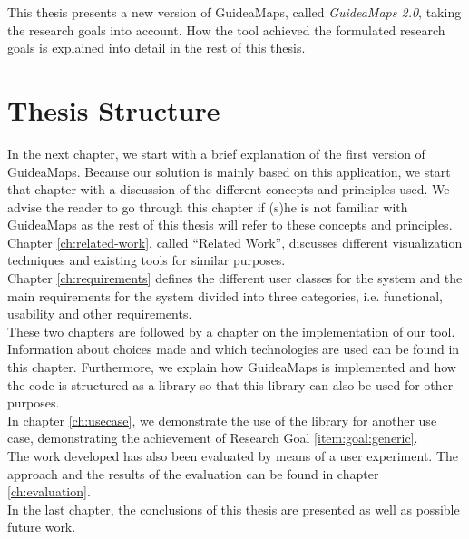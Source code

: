 This thesis presents a new version of GuideaMaps, called \textit{GuideaMaps 2.0}, taking the research goals into account. How the tool achieved the formulated research goals is explained into detail in the rest of this thesis.\\




\section{Thesis Structure}\label{sec:thesis-structure}
In the next chapter, we start with a brief explanation of the first version of GuideaMaps. Because our solution is mainly based on this application, we start that chapter with a discussion of the different concepts and principles used. We advise the reader to go through this chapter if (s)he is not familiar with GuideaMaps as the rest of this thesis will refer to these concepts and principles.\\

Chapter \ref{ch:related-work}, called ``Related Work'', discusses different visualization techniques and existing tools for similar purposes.\\

Chapter \ref{ch:requirements} defines the different user classes for the system and the main requirements for the system divided into three categories, i.e. functional, usability and other requirements.\\

These two chapters are followed by a chapter on the implementation of our tool. Information about choices made and which technologies are used can be found in this chapter. Furthermore, we explain how GuideaMaps is implemented and how the code is structured as a library so that this library can also be used for other purposes.\\ 

In chapter \ref{ch:usecase}, we demonstrate the use of the library for another use case, demonstrating the achievement of Research Goal \ref{item:goal:generic}.\\

The work developed has also been evaluated by means of a user experiment. The approach and the results of the evaluation can be found in chapter \ref{ch:evaluation}.\\

In the last chapter, the conclusions of this thesis are presented as well as possible future work.




